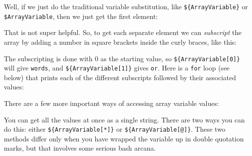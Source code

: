 \documentclass[]{krantz}
\makeatletter
\newenvironment{Shaded}{\begin{snugshade}}{\end{snugshade}}
\newcommand{\BuiltInTok}[1]{#1}
\newcommand{\CommentTok}[1]{\textcolor[rgb]{0.37,0.37,0.37}{\textit{#1}}}
\newcommand{\DataTypeTok}[1]{\textcolor[rgb]{0.27,0.27,0.27}{#1}}
\newcommand{\ExtensionTok}[1]{#1}
\newcommand{\KeywordTok}[1]{\textcolor[rgb]{0.27,0.27,0.27}{\textbf{#1}}}
\newcommand{\NormalTok}[1]{#1}
\newcommand{\VariableTok}[1]{\textcolor[rgb]{0,0,0}{#1}}
\newenvironment{kframe}{%
\medskip{}
\setlength{\fboxsep}{.8em}
 \def\at@end@of@kframe{}%
 \ifinner\ifhmode%
  \def\at@end@of@kframe{\end{minipage}}%
  \begin{minipage}{\columnwidth}%
 \fi\fi%
 \def\FrameCommand##1{\hskip\@totalleftmargin \hskip-\fboxsep
 \colorbox{shadecolor}{##1}\hskip-\fboxsep
     \hskip-\linewidth \hskip-\@totalleftmargin \hskip\columnwidth}%
 \MakeFramed {\advance\hsize-\width
   \@totalleftmargin\z@ \linewidth\hsize
   \@setminipage}}%
 {\par\unskip\endMakeFramed%
 \at@end@of@kframe}
\renewenvironment{Shaded}{\begin{kframe}}{\end{kframe}}
\makeatother
\begin{document}
Well, if we just do the traditional variable substitution, like \texttt{\$\{ArrayVariable\}} or
\texttt{\$ArrayVariable}, then we just get the first element:

\begin{Shaded}
\end{Shaded}

That is not super helpful. So, to get each separate element we can
\emph{subscript} the array by adding a number in square brackets inside the
curly braces, like this:

\begin{Shaded}
\end{Shaded}

The subscripting is done with 0 as the starting value, so \texttt{\$\{ArrayVariable{[}0{]}\}}
will give \texttt{words}, and \texttt{\$\{ArrayVariable{[}1{]}\}} gives \texttt{or}.
Here is a \texttt{for} loop (see below) that prints each of the different subscripts
followed by their associated values:

\begin{Shaded}
\end{Shaded}

There are a few more important ways of accessing array variable values:

You can get all the values at once as a single string. There are two
ways you can do this: either \texttt{\$\{ArrayVariable{[}*{]}\}} or
\texttt{\$\{ArrayVariable{[}@{]}\}}. These two methods differ only when you have wrapped the variable up
in double quotation marks, but that involves some serious bash arcana.
\end{document}
